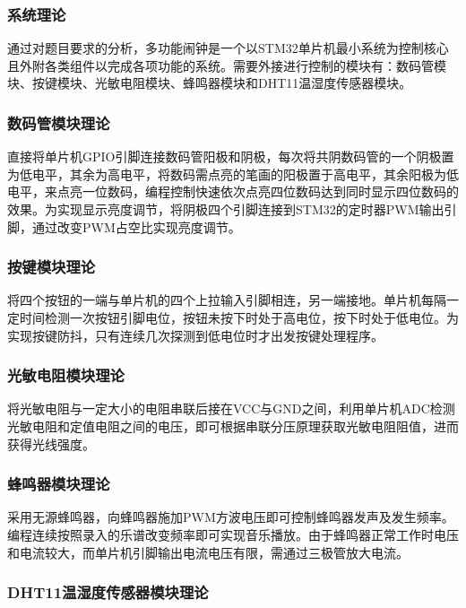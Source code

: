 \documentclass[a4paper,11pt,UTF8]{ctexart}
\begin{document}
\subsubsection{系统理论}

通过对题目要求的分析，多功能闹钟是一个以STM32单片机最小系统为控制核心且外附各类组件以完成各项功能的系统。需要外接进行控制的模块有：数码管模块、按键模块、光敏电阻模块、蜂鸣器模块和DHT11温湿度传感器模块。

\subsubsection{数码管模块理论}

直接将单片机GPIO引脚连接数码管阳极和阴极，每次将共阴数码管的一个阴极置为低电平，其余为高电平，将数码需点亮的笔画的阳极置于高电平，其余阳极为低电平，来点亮一位数码，编程控制快速依次点亮四位数码达到同时显示四位数码的效果。为实现显示亮度调节，将阴极四个引脚连接到STM32的定时器PWM输出引脚，通过改变PWM占空比实现亮度调节。

\subsubsection{按键模块理论}

将四个按钮的一端与单片机的四个上拉输入引脚相连，另一端接地。单片机每隔一定时间检测一次按钮引脚电位，按钮未按下时处于高电位，按下时处于低电位。为实现按键防抖，只有连续几次探测到低电位时才出发按键处理程序。

\subsubsection{光敏电阻模块理论}

将光敏电阻与一定大小的电阻串联后接在VCC与GND之间，利用单片机ADC检测光敏电阻和定值电阻之间的电压，即可根据串联分压原理获取光敏电阻阻值，进而获得光线强度。

\subsubsection{蜂鸣器模块理论}

采用无源蜂鸣器，向蜂鸣器施加PWM方波电压即可控制蜂鸣器发声及发生频率。编程连续按照录入的乐谱改变频率即可实现音乐播放。由于蜂鸣器正常工作时电压和电流较大，而单片机引脚输出电流电压有限，需通过三极管放大电流。

\subsubsection{DHT11温湿度传感器模块理论}
\end{document}
